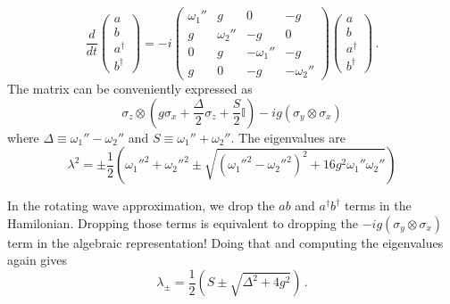 \begin{equation}
  \frac{d}{dt}
  \left( \begin{array}{c}
    a \\ b \\ a^\dagger \\ b^\dagger
  \end{array} \right)
  =
  -i \left( \begin{array}{cccc}
    \omega_1'' & g & 0 & -g \\
    g & \omega_2'' & -g & 0 \\
    0 & g & - \omega_1'' & -g \\
    g & 0 & -g & - \omega_2''
  \end{array} \right)
  \left( \begin{array}{c}
    a \\ b \\ a^\dagger \\ b^\dagger
  \end{array} \right)
  \, .
\end{equation}
The matrix can be conveniently expressed as
\begin{equation}
  \sigma_z \otimes \left(
    g \sigma_x + \frac{\Delta}{2} \sigma_z + \frac{S}{2} \mathbb{I}
  \right)
  -i g \left( \sigma_y \otimes \sigma_x \right)
\end{equation}
where $\Delta \equiv \omega_1'' - \omega_2''$ and $S \equiv \omega_1'' + \omega_2''$.
The eigenvalues are
\begin{equation}
  \lambda^2 =
  \pm \frac{1}{2}
  \left(
    \omega_1''^2 + \omega_2''^2
    \pm \sqrt{(\omega_1''^2 - \omega_2''^2)^2 + 16 g^2 \omega_1'' \omega_2''}
  \right)
\end{equation}

In the rotating wave approximation, we drop the $ab$ and $a^\dagger b^\dagger$ terms in the Hamilonian.
Dropping those terms is equivalent to dropping the $-i g \left( \sigma_y \otimes \sigma_x \right)$ term in the algebraic representation!
Doing that and computing the eigenvalues again gives
\begin{equation}
  \lambda_\pm =
  \frac{1}{2} \left( S \pm \sqrt{\Delta^2 + 4 g^2} \right) \, .
\end{equation}

